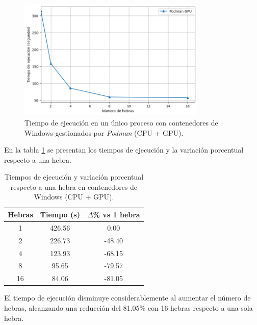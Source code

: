 \begin{figure}[ht]
    \centering
    \includegraphics[width=0.8\textwidth]{imagenes/cap5/single-node_ubuntu_podman_gpu_time.png}
    \caption{Tiempo de ejecución en un único proceso con contenedores de Windows gestionados por \textit{Podman} (CPU + GPU).}
    \label{fig:single-node_windows_podman_gpu_time}
\end{figure}

En la tabla \ref{tab:single-node_windows_podman_gpu} se presentan los tiempos de ejecución y la variación porcentual respecto a una hebra.

\begin{table}[ht]
    \centering
    \begin{tabular}{|c|c|c|}
        \hline
        \textbf{Hebras} & \textbf{Tiempo (s)} & \textbf{$\Delta$\% vs 1 hebra} \\
        \hline
        1               & 426.56              & 0.00                           \\
        2               & 226.73              & -48.40                         \\
        4               & 123.93              & -68.15                         \\
        8               & 95.65               & -79.57                         \\
        16              & 84.06               & -81.05                         \\
        \hline
    \end{tabular}
    \caption{Tiempos de ejecución y variación porcentual respecto a una hebra en contenedores de Windows (CPU + GPU).}
    \label{tab:single-node_windows_podman_gpu}
\end{table}

El tiempo de ejecución disminuye considerablemente al aumentar el número de hebras, alcanzando una reducción del 81.05\% con 16 hebras respecto a una sola hebra.

